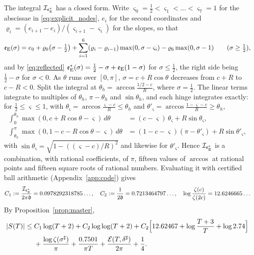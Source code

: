 \documentclass[11pt,a4paper]{article}
\makeatletter
\numberwithin{equation}{section}
\DeclareRobustCommand{\CGref}[1]{\ref{#1}}
\DeclareRobustCommand{\CGeqref}[1]{\eqref{#1}}
\let\CG@origref\ref
\let\CG@origeqref\eqref
\newcommand{\CG@gettip}[1]{\@ifundefined{CGTip@#1}{#1}{\csname CGTip@#1\endcsname}}
\DeclareRobustCommand{\CGref}[1]{\pdftooltip{\CG@origref{#1}}{\CG@gettip{#1}}}
\DeclareRobustCommand{\CGeqref}[1]{\pdftooltip{\CG@origeqref{#1}}{\CG@gettip{#1}}}
\theoremstyle{definition}
\theoremstyle{remark}
\newcommand{\eE}{\mathfrak e_{\rm E}}
\makeatother
\begin{document}
The integral $\mathcal I_{\eE^*}$ has a closed form. Write $\varsigma_0=\frac12<\varsigma_1<\dots<\varsigma_7=1$ for the abscissae in \CGeqref{eq:explicit_nodes}, $e_i$ for the second coordinates and $\varrho_i=(e_{i+1}-e_i)/(\varsigma_{i+1}-\varsigma_i)$ for the slopes, so that
\begin{equation}
\eE(\sigma)=e_0+\varrho_0\bigl(\sigma-\tfrac12\bigr)+\sum_{i=1}^{6}(\varrho_i-\varrho_{i-1})\max(0,\sigma-\varsigma_i)-\varrho_6\max(0,\sigma-1)\qquad(\sigma\ge\tfrac12),
\label{eq:disp_18}
\end{equation}
and by \CGeqref{eq:reflected} $\eE^*(\sigma)=\frac12-\sigma+\eE(1-\sigma)$ for $\sigma\le\frac12$, the right side being $\frac12-\sigma$ for $\sigma<0$. As $\theta$ runs over $[0,\pi]$, $\sigma=c+R\cos\theta$ decreases from $c+R$ to $c-R<0$. Split the integral at $\theta_h=\arccos\frac{1/2-c}R$, where $\sigma=\frac12$. The linear terms integrate to multiples of $\theta_h$, $\pi-\theta_h$ and $\sin\theta_h$, and each hinge integrates exactly: for $\frac12\le\varsigma\le1$, with $\theta_\varsigma=\arccos\frac{\varsigma-c}R\le\theta_h$ and $\theta'_\varsigma=\arccos\frac{1-\varsigma-c}R\ge\theta_h$,
\begin{equation}
\begin{aligned}
\int_0^{\theta_h}\max(0,c+R\cos\theta-\varsigma)\,d\theta&=(c-\varsigma)\,\theta_\varsigma+R\sin\theta_\varsigma,\\
\int_{\theta_h}^{\pi}\max(0,1-c-R\cos\theta-\varsigma)\,d\theta&=(1-c-\varsigma)(\pi-\theta'_\varsigma)+R\sin\theta'_\varsigma,
\end{aligned}
\label{eq:hinge_integrals}
\end{equation}
with $\sin\theta_\varsigma=\sqrt{1-((\varsigma-c)/R)^2}$ and likewise for $\theta'_\varsigma$. Hence $\mathcal I_{\eE^*}$ is a combination, with rational coefficients, of $\pi$, fifteen values of $\arccos$ at rational points and fifteen square roots of rational numbers. Evaluating it with certified ball arithmetic (Appendix~\CGref{app:code}) gives
\begin{equation}
C_1:=\frac{\mathcal I_{\eE^*}}{2\pi\mathfrak d}=0.0978292318785\ldots,\quad C_2:=\frac1{2\mathfrak d}=0.7213464797\ldots,\quad \log\frac{\zeta(c)}{\zeta(2c)}=12.6246665\ldots
\label{eq:C1_value}
\end{equation}
By Proposition~\CGref{prop:master},
\begin{equation}
\begin{split}
|S(T)|\le{}&C_1\log(T+2)+C_2\log\log(T+2)+C_2\Bigl[12.62467+\log\frac{T+3}T+\log2.74\Bigr]\\
&+\frac{\log\zeta(\sigma^\sharp)}\pi+\frac{0.7501}{\pi T}+\frac{\mathcal E(T,\delta^\sharp)}{2\pi}+\frac14 .
\end{split}
\label{eq:explicit_assembled}
\end{equation}
\end{document}
